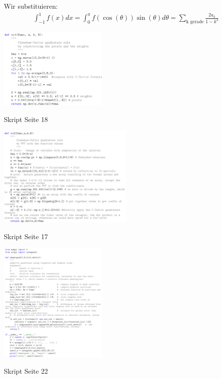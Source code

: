 \vspace{1\baselineskip}

 {

    Wir substituieren:
    \begin{align*}
        \int_{-1}^1 f(x) dx = \int_0^{\pi} f(\cos(\theta)) \sin(\theta) d \theta
        = \sum_{\text{k gerade}} \frac{2 a_k}{1-k^2}
    \end{align*}

    \begin{center}
        \includegraphics[width=0.4\textwidth]{Figures/cc1.png}

        Skript Seite 18
    \end{center}
    

    \begin{center}
        \includegraphics[width=0.5\textwidth]{Figures/cc2.png}

        Skript Seite 17
    \end{center}
}

\vspace{1\baselineskip}


    \begin{center}
        \includegraphics[width=0.4\textwidth]{Figures/AdaptQuad.png}

        Skript Seite 22
    \end{center}


